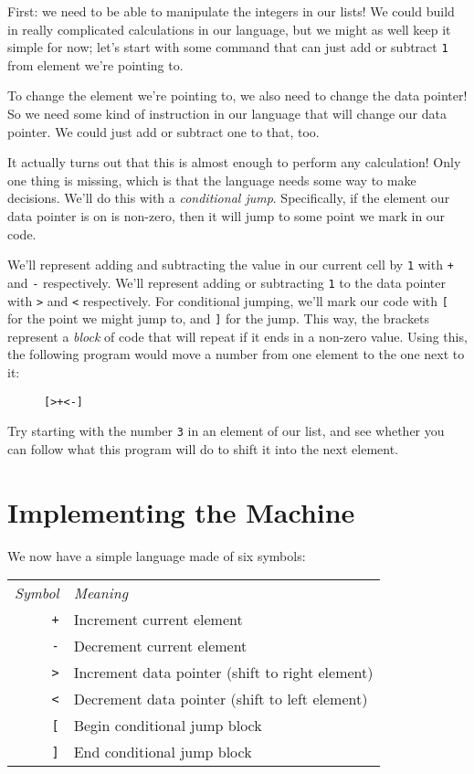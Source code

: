 \documentclass[12pt,draft]{article}
\begin{document}
First: we need to be able to manipulate the integers in our lists! We could
build in really complicated calculations in our language, but we might as well
keep it simple for now; let's start with some command that can just add or
subtract \verb|1| from element we're pointing to.\par

To change the element we're pointing to, we also need to change the data
pointer! So we need some kind of instruction in our language that will change
our data pointer. We could just add or subtract one to that, too.\par

It actually turns out that this is almost enough to perform any calculation!
Only one thing is missing, which is that the language needs some way to make
decisions. We'll do this with a \emph{conditional jump}. Specifically, if the element our
data pointer is on is non-zero, then it will jump to some point we mark in our
code.\par

We'll represent adding and subtracting the value in our current cell by \verb|1|
with \verb|+| and \verb|-| respectively. We'll represent adding or subtracting
\verb|1| to the data pointer with \verb|>| and \verb|<| respectively. For
conditional jumping, we'll mark our code with \verb|[| for the point we might
jump to, and \verb|]| for the jump. This way, the brackets represent a
\emph{block} of code that will repeat if it ends in a non-zero value. Using
this, the following program would move a number from one element to the one next
to it:

\begin{figure}[H]
  \begin{centering}
    \verb|[>+<-]|
  \end{centering}
\end{figure}

Try starting with the number \verb|3| in an element of our list, and see whether
you can follow what this program will do to shift it into the next element.


\section{Implementing the Machine}

We now have a simple language made of six symbols:

\begin{tabular}{r|l}
  \emph{Symbol} & \emph{Meaning} \\
  \verb|+| & Increment current element \\
  \verb|-| & Decrement current element \\
  \verb|>| & Increment data pointer (shift to right element) \\
  \verb|<| & Decrement data pointer (shift to left element) \\
  \verb|[| & Begin conditional jump block \\
  \verb|]| & End conditional jump block
\end{tabular}
\end{document}
